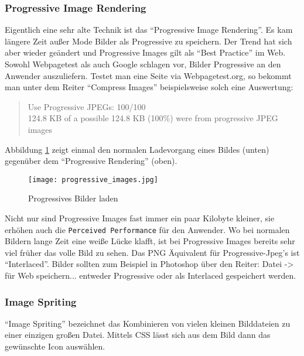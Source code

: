 		\subsubsection{Progressive Image Rendering} %
		\label{ssub:progressive_image_rendering}
			Eigentlich eine sehr alte Technik ist das "`Progressive Image Rendering"'. Es kam längere Zeit außer Mode Bilder als Progressive zu speichern. Der Trend hat sich aber wieder geändert und Progressive Images gilt als "`Best Practice"' im Web. Sowohl Webpagetest als auch Google schlagen vor, Bilder Progressive an den Anwender auszuliefern. Testet man eine Seite via Webpagetest.org, so bekommt man unter dem Reiter "`Compress Images"' beispielsweise solch eine Auswertung:
			\begin{quote}
				Use Progressive JPEGs: 100/100\\
				124.8 KB of a possible 124.8 KB (100\%) were from progressive JPEG images
			\end{quote}

			Abbildung \ref{fig:progressive_images} zeigt einmal den normalen Ladevorgang eines Bildes (unten) gegenüber dem "`Progressive Rendering"' (oben).

			\begin{figure}[htbp]
				\begin{center}
					\texttt{[image: progressive\_images.jpg]}
					\caption{Progressives Bilder laden}
					\label{fig:progressive_images}
				\end{center}
			\end{figure}

			Nicht nur sind Progressive Images fast immer ein paar Kilobyte kleiner, sie erhöhen auch die \texttt{Perceived Performance} für den Anwender. Wo bei normalen Bildern lange Zeit eine weiße Lücke klafft, ist bei Progressive Images bereits sehr viel früher das volle Bild zu sehen. Das PNG Äquivalent für Progressive-Jpeg's ist "`Interlaced"'. Bilder sollten zum Beispiel in Photoshop über den Reiter: Datei -> für Web speichern... entweder Progressive oder als Interlaced gespeichert werden.

		\subsubsection{Image Spriting} %
		\label{ssub:image_spriting}
			"`Image Spriting"' bezeichnet das Kombinieren von vielen kleinen Bilddateien zu einer einzigen großen Datei. Mittels CSS lässt sich aus dem Bild dann das gewünschte Icon auswählen.

